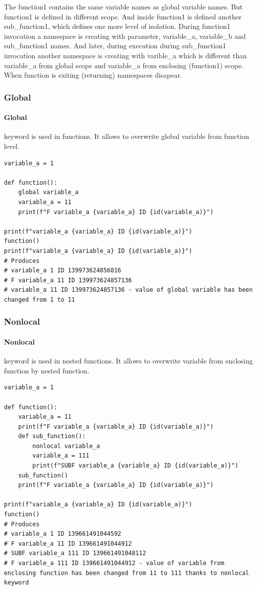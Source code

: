 \documentclass{article}
\begin{document}
The function1 contains the same variable names as global variable names. But function1 is defined in different scope. And inside function1 is defined another sub\_function1, which defines one more level of isolation. During function1 invocation a namespace is creating with parameter, variable\_a, variable\_b and sub\_function1 names. And later, during execution during sub\_function1 invocation another namespace is creating with varible\_a which is different than variable\_a from global scope and variable\_a from enclosing (function1) scope. When function is exiting (returning) namespaces disapear.

\subsubsection{Global}
\paragraph{Global} keyword is used in functions. It allows to overwrite global variable from function level.
\begin{lstlisting}[style=pystyle]
variable_a = 1

def function():
    global variable_a
    variable_a = 11
    print(f"F variable_a {variable_a} ID {id(variable_a)}")

print(f"variable_a {variable_a} ID {id(variable_a)}")
function()
print(f"variable_a {variable_a} ID {id(variable_a)}")
# Produces
# variable_a 1 ID 139973624856816
# F variable_a 11 ID 139973624857136
# variable_a 11 ID 139973624857136 - value of global variable has been changed from 1 to 11
\end{lstlisting}

\subsubsection{Nonlocal}
\paragraph{Nonlocal} keyword is used in nested functions. It allows to overwrite variable from enclosing function by nested function.
\begin{lstlisting}[style=pystyle]
variable_a = 1

def function():
    variable_a = 11
    print(f"F variable_a {variable_a} ID {id(variable_a)}")
    def sub_function():
        nonlocal variable_a
        variable_a = 111
        print(f"SUBF variable_a {variable_a} ID {id(variable_a)}")
    sub_function()
    print(f"F variable_a {variable_a} ID {id(variable_a)}")

print(f"variable_a {variable_a} ID {id(variable_a)}")
function()
# Produces
# variable_a 1 ID 139661491044592
# F variable_a 11 ID 139661491044912
# SUBF variable_a 111 ID 139661491048112 
# F variable_a 111 ID 139661491044912 - value of variable from enclosing function has been changed from 11 to 111 thanks to nonlocal keyword
\end{lstlisting}
\end{document}
